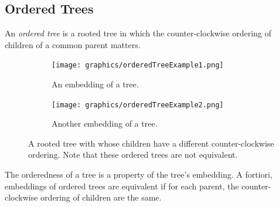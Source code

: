 \subsection{Ordered Trees}
An \textit{ordered tree} is a rooted tree in which the counter-clockwise ordering of children of a 
common parent matters.
\begin{figure}[h]
\begin{center}
  \begin{subfigure}[b]{0.4\textwidth}
    \texttt{[image: graphics/orderedTreeExample1.png]}
    \caption{An embedding of a tree.}\label{fig:ch1-graph-4}
  \end{subfigure}
  \begin{subfigure}[b]{0.4\textwidth}
    \texttt{[image: graphics/orderedTreeExample2.png]}
    \caption{Another embedding of a tree.}\label{fig:ch1-graph-5}
  \end{subfigure}
  \caption{A rooted tree with whose children have a different counter-clockwise 
ordering.  Note that these ordered trees are not equivalent.}\label{fig:ch1-graph-6}
\end{center}
\end{figure}
The orderedness of a tree is a property of the tree's embedding.  A fortiori, embeddings of ordered 
trees are equivalent if for each parent, the counter-clockwise ordering of children are the same.
